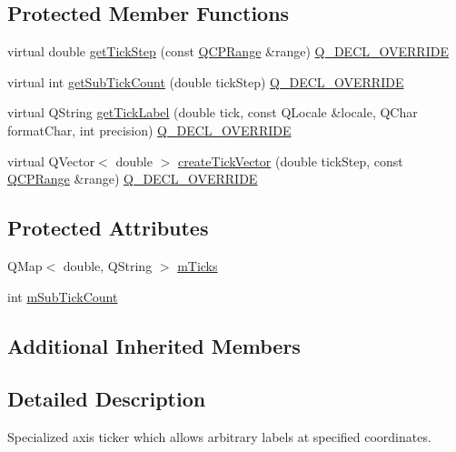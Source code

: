 \subsection*{Protected Member Functions}
\begin{DoxyCompactItemize}
\item 
virtual double \hyperlink{class_q_c_p_axis_ticker_text_a628f16c41905e8c95c6622d6757a38c4}{get\+Tick\+Step} (const \hyperlink{class_q_c_p_range}{Q\+C\+P\+Range} \&range) \hyperlink{qcustomplot_8h_a42cc5eaeb25b85f8b52d2a4b94c56f55}{Q\+\_\+\+D\+E\+C\+L\+\_\+\+O\+V\+E\+R\+R\+I\+DE}
\item 
virtual int \hyperlink{class_q_c_p_axis_ticker_text_a9c2488b877776870239abda4c8106052}{get\+Sub\+Tick\+Count} (double tick\+Step) \hyperlink{qcustomplot_8h_a42cc5eaeb25b85f8b52d2a4b94c56f55}{Q\+\_\+\+D\+E\+C\+L\+\_\+\+O\+V\+E\+R\+R\+I\+DE}
\item 
virtual Q\+String \hyperlink{class_q_c_p_axis_ticker_text_a99247779a9c20bea1f50911117540a71}{get\+Tick\+Label} (double tick, const Q\+Locale \&locale, Q\+Char format\+Char, int precision) \hyperlink{qcustomplot_8h_a42cc5eaeb25b85f8b52d2a4b94c56f55}{Q\+\_\+\+D\+E\+C\+L\+\_\+\+O\+V\+E\+R\+R\+I\+DE}
\item 
virtual Q\+Vector$<$ double $>$ \hyperlink{class_q_c_p_axis_ticker_text_aa195c4fd0364d0393f1798fb495d6a60}{create\+Tick\+Vector} (double tick\+Step, const \hyperlink{class_q_c_p_range}{Q\+C\+P\+Range} \&range) \hyperlink{qcustomplot_8h_a42cc5eaeb25b85f8b52d2a4b94c56f55}{Q\+\_\+\+D\+E\+C\+L\+\_\+\+O\+V\+E\+R\+R\+I\+DE}
\end{DoxyCompactItemize}
\subsection*{Protected Attributes}
\begin{DoxyCompactItemize}
\item 
Q\+Map$<$ double, Q\+String $>$ \hyperlink{class_q_c_p_axis_ticker_text_a27c48539feb6c293979cd8059ba220c3}{m\+Ticks}
\item 
int \hyperlink{class_q_c_p_axis_ticker_text_a206d092b1598eecb981bba7fb16ff44e}{m\+Sub\+Tick\+Count}
\end{DoxyCompactItemize}
\subsection*{Additional Inherited Members}


\subsection{Detailed Description}
Specialized axis ticker which allows arbitrary labels at specified coordinates. 



